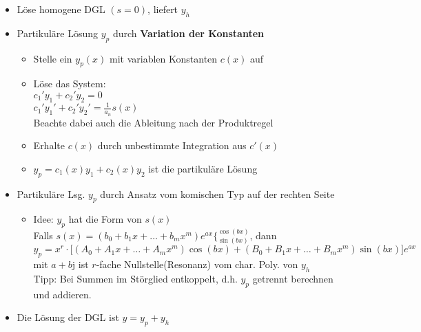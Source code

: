 \documentclass[6pt,a4paper]{scrartcl}
\renewcommand{\emph}[1]{\textbf{#1}}
\renewcommand{\i}{\ensuremath{\mathrm{j}}}										%
\begin{document}
\begin{multicols}{4}
	\begin{itemize}[itemsep=0pt, leftmargin=8pt]
	\item Löse homogene DGL $(s = 0)$, liefert $y_h$
	\item Partikuläre Lösung $y_p$ durch \emph{Variation der Konstanten}
		\begin{itemize}[itemsep=0pt, leftmargin=8pt]
		\item Stelle ein $y_p (x)$ mit variablen Konstanten $c(x)$ auf
		\item Löse das System: \\
		$c_1' y_1 + c_2' y_2 = 0$ \\
		$c_1' y_1' + c_2' y_2' = \frac{1}{a_n} s(x)$ \\
		Beachte dabei auch die Ableitung nach der Produktregel
		\item Erhalte $c(x)$ durch unbestimmte Integration aus $c'(x)$
		\item $y_p = c_1 (x) y_1 + c_2 (x) y_2$ ist die partikuläre Lösung
	 	\end{itemize}
	\item Partikuläre Lsg. $y_p$ durch Ansatz vom komischen Typ auf der rechten Seite
		\begin{itemize}[itemsep=0pt, leftmargin=8pt]
		\item Idee: $y_p$ hat die Form von $s(x)$\\
		Falls $s(x) = (b_0 + b_1 x + \ldots + b_m x^m) e^{ax}  \Big\{ {}^{\textstyle \cos(bx)} _{\textstyle \sin(bx)}$, dann\\
		$y_p = x^r \cdot \big[ (A_0 + A_1 x + \ldots + A_m x^m) \cos(bx) + (B_0 + B_1 x + \ldots + B_m x^m) \sin(bx) \big] e^{ax}$ \\
		mit $a+b\i$ ist $r$-fache Nullstelle(Resonanz) vom char. Poly. von $y_h$ \\
		Tipp: Bei Summen im Störglied entkoppelt, d.h. $y_p$ getrennt berechnen und addieren.
		\end{itemize}
	\item Die Lösung der DGL ist $y = y_p + y_h$
	\end{itemize}	


\end{multicols}
\end{document}
